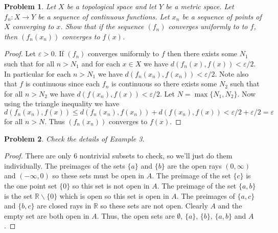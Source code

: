 \documentclass{article}
\newtheorem{problem}{Problem}
\begin{document}
\begin{problem}
Let $X$ be a topological space and let $Y$ be a metric space. Let $f_n : X \to Y$ be a sequence of continuous functions. Let $x_n$ be a sequence of points of $X$ converging to $x$. Show that if the sequence $(f_n)$ converges uniformly to to $f$, then $(f_n(x_n))$ converges to $f(x)$.
\end{problem}
\begin{proof}
Let $\varepsilon > 0$. If $(f_n)$ converges uniformly to $f$ then there exists some $N_1$ such that for all $n > N_1$ and for each $x \in X$ we have $d(f_n(x), f(x)) < \varepsilon/2$. In particular for each $n > N_1$ we have $d(f_n(x_n), f(x_n)) < \varepsilon/2$. Note also that $f$ is continuous since each $f_n$ is continuous so there exists some $N_2$ such that for all $n > N_2$ we have $d(f(x_n),f(x)) < \varepsilon/2$. Let $N = \max\{N_1, N_2\}$. Now using the triangle inequality we have $d(f_n(x_n),f(x)) \leq d(f_n(x_n), f(x_n)) + d(f(x_n), f(x)) < \varepsilon/2 + \varepsilon/2 = \varepsilon$ for all $n > N$. Thus $(f_n(x_n))$ converges to $f(x)$.
\end{proof}

\begin{problem}
Check the details of Example 3.
\end{problem}
\begin{proof}
There are only $6$ nontrivial subsets to check, so we'll just do them individually. The preimages of the sets $\{a\}$ and $\{b\}$ are the open rays $(0, \infty)$ and $(-\infty, 0)$ so these sets must be open in $A$. The preimage of the set $\{c\}$ is the one point set $\{0\}$ so this set is not open in $A$. The preimage of the set $\{a,b\}$ is the set $\mathbb{R} \backslash \{0\}$ which is open so this set is open in $A$. The preimages of $\{a,c\}$ and $\{b,c\}$ are closed rays in $\mathbb{R}$ so these sets are not open. Clearly $A$ and the empty set are both open in $A$. Thus, the open sets are $\emptyset$, $\{a\}$, $\{b\}$, $\{a,b\}$ and $A$.
\end{proof}
\end{document}
